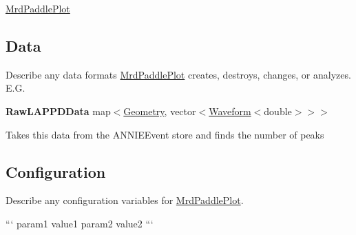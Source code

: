 \hyperlink{classMrdPaddlePlot}{Mrd\-Paddle\-Plot}

\subsection*{Data}

Describe any data formats \hyperlink{classMrdPaddlePlot}{Mrd\-Paddle\-Plot} creates, destroys, changes, or analyzes. E.\-G.

{\bfseries Raw\-L\-A\-P\-P\-D\-Data} {\ttfamily map$<$\hyperlink{classGeometry}{Geometry}, vector$<$\hyperlink{classWaveform}{Waveform}$<$double$>$$>$$>$}
\begin{DoxyItemize}
\item Takes this data from the {\ttfamily A\-N\-N\-I\-E\-Event} store and finds the number of peaks
\end{DoxyItemize}

\subsection*{Configuration}

Describe any configuration variables for \hyperlink{classMrdPaddlePlot}{Mrd\-Paddle\-Plot}.

``` param1 value1 param2 value2 ``` 